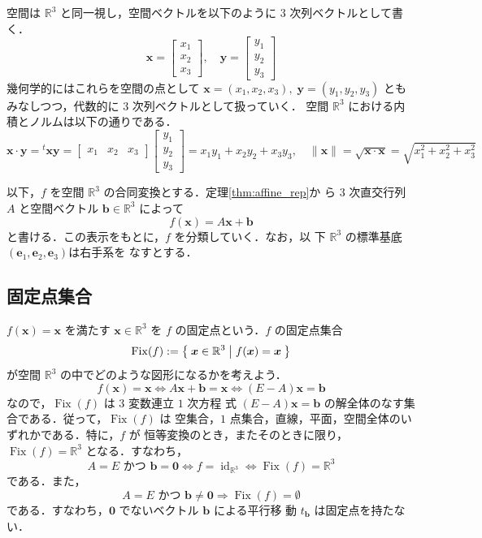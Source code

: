 \documentclass[11pt, uplatex, dvipdfmx, titlepage]{jsarticle}
\DeclareMathOperator{\Fix}{Fix}
\DeclareMathOperator{\id}{id}
\theoremstyle{definition}
\begin{document}
空間は $\mathbb{R}^3$ と同一視し，空間ベクトルを以下のように $3$ 次列ベクトルとして書く．
\[
  \bm{x} = \left[
  \begin{array}{c}
    x_1\\
    x_2\\
    x_3
  \end{array}
\right], \quad \bm{y}= \left[
  \begin{array}{c}
    y_1\\
    y_2\\
    y_3
  \end{array}
\right] 
\]
幾何学的にはこれらを空間の点として $\bm{x}=(x_1,x_2,x_3), \;
\bm{y}=(y_1,y_2, y_3)$ ともみなしつつ，代数的に $3$ 次列ベクトルとして扱っていく．
空間 $\mathbb{R}^3$ における内積とノルムは以下の通りである．
\[
  \bm{x} \cdot  \bm{y} = {}^{t}\bm{x} \bm{y} = \left[
    \begin{array}{ccc}
      x_1 & x_2 & x_3
    \end{array}
  \right] \left[
    \begin{array}{c}
      y_1\\
      y_2\\
      y_3
    \end{array}
  \right] = x_1 y_1 + x_2 y_2 + x_3 y_3, \quad \| \bm{x} \| =
  \sqrt{\bm{x} \cdot \bm{x}} = \sqrt{x_1^2+x_2^2+x_3^2}
\]

以下，$f$ を空間 $\mathbb{R}^3$ の合同変換とする．定理\ref{thm:affine_rep}か
ら $3$ 次直交行列 $A$ と空間ベクトル $\bm{b} \in \mathbb{R}^3$ によって
\[
  f(\bm{x}) = A \bm{x} + \bm{b}
\]
と書ける．この表示をもとに，$f$ を分類していく．なお，以
下 $\mathbb{R}^3$ の標準基底 $(\bm{e}_1, \bm{e}_2, \bm{e}_3)$は右手系を
なすとする．

\subsection{固定点集合}\label{sec:inv3}

$f(\bm{x}) = \bm{x}$ を満たす $\bm{x} \in \mathbb{R}^3$ を $f$ の固定点という．$f$ の固定点集合
\[
  \Fix(f) := \Set{\bm{x} \in \mathbb{R}^3 | f(\bm{x}) = \bm{x}}
\]
が空間 $\mathbb{R}^3$ の中でどのような図形になるかを考えよう．
\[
  f(\bm{x}) = \bm{x} \Leftrightarrow A\bm{x} + \bm{b} = \bm{x}
  \Leftrightarrow (E-A)\bm{x} = \bm{b}
\]
なので，$\Fix(f)$ は $3$ 変数連立 $1$ 次方程
式 $(E-A)\bm{x}=\bm{b}$ の解全体のなす集合である．従って，$\Fix(f)$ は
空集合，$1$ 点集合，直線，平面，空間全体のいずれかである．特に，$f$ が
恒等変換のとき，またそのときに限り，$\Fix(f) = \mathbb{R}^3$ となる．すなわち，
\[
  A=E \text{ かつ } \bm{b} = \bm{0} \Leftrightarrow f =
  \id_{\mathbb{R}^3} \Leftrightarrow \Fix(f) = \mathbb{R}^3
\]
である．また，
\[
  A=E \text{ かつ } \bm{b} \neq \bm{0} \Rightarrow \Fix(f) = \emptyset
\]
である．すなわち，$\bm{0}$ でないベクトル $\bm{b}$ による平行移
動 $t_{\bm{b}}$ は固定点を持たない．
\end{document}
